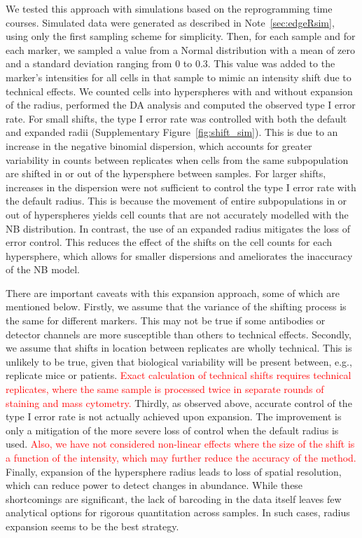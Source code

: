 \documentclass{article}
\newcommand\revised[1]{\textcolor{red}{#1}}
\begin{document}
We tested this approach with simulations based on the reprogramming time courses.
Simulated data were generated as described in Note~\ref{sec:edgeRsim}, using only the first sampling scheme for simplicity.
Then, for each sample and for each marker, we sampled a value from a Normal distribution with a mean of zero and a standard deviation ranging from 0 to 0.3.
This value was added to the marker's intensities for all cells in that sample to mimic an intensity shift due to technical effects.
We counted cells into hyperspheres with and without expansion of the radius, performed the DA analysis and computed the observed type I error rate.
For small shifts, the type I error rate was controlled with both the default and expanded radii (Supplementary Figure~\ref{fig:shift_sim}).
This is due to an increase in the negative binomial dispersion, which accounts for greater variability in counts between replicates when cells from the same subpopulation are shifted in or out of the hypersphere between samples. 
For larger shifts, increases in the dispersion were not sufficient to control the type I error rate with the default radius.
This is because the movement of entire subpopulations in or out of hyperspheres yields cell counts that are not accurately modelled with the NB distribution.
In contrast, the use of an expanded radius mitigates the loss of error control.
This reduces the effect of the shifts on the cell counts for each hypersphere, which allows for smaller dispersions and ameliorates the inaccuracy of the NB model.

There are important caveats with this expansion approach, some of which are mentioned below.
Firstly, we assume that the variance of the shifting process is the same for different markers.
This may not be true if some antibodies or detector channels are more susceptible than others to technical effects.
Secondly, we assume that shifts in location between replicates are wholly technical.
This is unlikely to be true, given that biological variability will be present between, e.g., replicate mice or patients.
\revised{Exact calculation of technical shifts requires technical replicates, where the same sample is processed twice in separate rounds of staining and mass cytometry.}
Thirdly, as observed above, accurate control of the type I error rate is not actually achieved upon expansion.
The improvement is only a mitigation of the more severe loss of control when the default radius is used.
\revised{Also, we have not considered non-linear effects where the size of the shift is a function of the intensity, which may further reduce the accuracy of the method.}
Finally, expansion of the hypersphere radius leads to loss of spatial resolution, which can reduce power to detect changes in abundance.
While these shortcomings are significant, the lack of barcoding in the data itself leaves few analytical options for rigorous quantitation across samples.
In such cases, radius expansion seems to be the best strategy.
\end{document}
